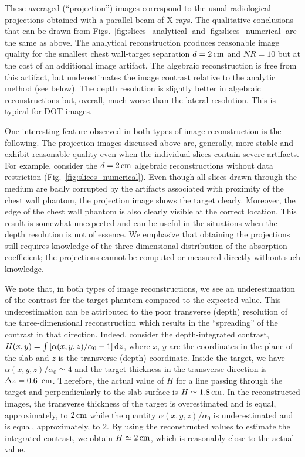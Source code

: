 These averaged (``projection'') images correspond to the usual radiological projections obtained with a parallel beam of X-rays. The qualitative conclusions that can be drawn from Figs.~\ref{fig:slices_analytical} and \ref{fig:slices_numerical} are the same as above. The analytical reconstruction produces reasonable image quality for the smallest chest wall-target separation $d=2\,{\rm
  cm}$ and $NR=10$ but at the cost of an additional image artifact. The algebraic reconstruction is free from this artifact, but underestimates the image contrast relative to the analytic method (see below). The depth resolution is slightly better in algebraic reconstructions but, overall, much worse than the lateral resolution. This is typical for DOT images.

One interesting feature observed in both types of image reconstruction is the following. The projection images discussed above are, generally, more stable and exhibit reasonable quality even when the
individual slices contain severe artifacts. For example, consider the $d=2\,{\rm cm}$ algebraic reconstructions without data restriction (Fig.~\ref{fig:slices_numerical}). Even though all slices drawn
through the medium are badly corrupted by the artifacts associated with proximity of the chest wall phantom, the projection image shows the target clearly. Moreover, the edge of the chest wall phantom is
also clearly visible at the correct location. This result is somewhat unexpected and can be useful in the situations when the depth resolution is not of essence. We emphasize that obtaining the projections still requires knowledge of the three-dimensional distribution of the absorption coefficient; the projections cannot be computed or measured directly without such knowledge.

We note that, in both types of image reconstructions, we see an underestimation of the contrast for the target phantom compared to the expected value. This underestimation can be attributed to the poor
transverse (depth) resolution of the three-dimensional reconstruction which results in the ``spreading'' of the contrast in that direction. Indeed, consider the depth-integrated contrast, $H(x,y) = \int \left[
  \alpha(x,y,z) / \alpha_0 - 1 \right] {\rm d}z$, where $x$, $y$ are the coordinates in the plane of the slab and $z$ is the transverse (depth) coordinate. Inside the target, we have $\alpha(x,y,z) /
\alpha_0 \simeq 4$ and the target thickness in the transverse direction is $\Delta z=0.6\,\ {\rm cm}$. Therefore, the actual value of $H$ for a line passing through the target and perpendicularly to
the slab surface is $H\simeq 1.8\,{\rm cm}$. In the reconstructed images, the transverse thickness of the target is overestimated and is equal, approximately, to $2\,{\rm cm}$ while the quantity
$\alpha(x,y,z)/\alpha_0$ is underestimated and is equal, approximately, to 2. By using the reconstructed values to estimate the integrated contrast, we obtain $H\simeq 2\,{\rm cm}$, which is
reasonably close to the actual value.


